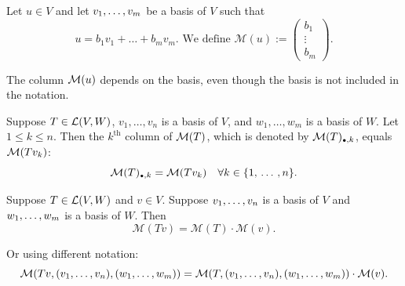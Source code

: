   \begin{mydef} 
    Let $u \in V$ and let $v_1, \dots, v_m$ be a basis of $V$ such that
  \begin{equation}
    u=b_1v_1+\dots+b_mv_m. \text{ We define }
        \mathcal{M}(u) :=
      \left (
      \begin{matrix}
        b_1 \\ \vdots \\ b_m
      \end{matrix}
      \right ).
  \end{equation}

    The column $\mathcal{M}(u)$ depends on the basis, even though the basis is not included in the notation.

  \end{mydef}

  \setcounter{thm}{74}
  \begin{thm} [$\mmatrix(T)_{\mathsmaller{\bullet}, k} = \mmatrix(T v_k)$]
    Suppose $T \in \mathcal{L}(V,W)$, $v_1, \ldots, v_n$ is a basis of $V$, and $w_1, \ldots, w_m$ is a basis of $W$. Let $1\leq k \leq n$. Then the $k^{\text{th}}$ column of $\mathcal{M}(T)$, which is denoted by $\mmatrix(T)_{\mathsmaller{\bullet}, k}$, equals $\mathcal{M}(Tv_k)$:
    \begin{equation}
      \mmatrix(T)_{\mathsmaller{\bullet}, k}=\mmatrix(Tv_k) \quad \forall k \in \{1, \ddd, n\}.
    \end{equation}
  \end{thm}

  \begin{thm} 
    Suppose $T\in {\mathcal{L}(V,W)}$ and $v\in V$. Suppose $v_1, \dots, v_n$ is a basis of $V$ and $w_1, \dots, w_m$ is a basis of $W$. Then
    \begin{equation}
      \mathcal{M} (Tv)=\mathcal{M}(T) \cdot \mathcal{M}(v).
    \end{equation}

    Or using different notation:
    \begin{equation}
      \mathcal{M} (Tv, (v_1, \dots, v_n), (w_1, \dots, w_m))=\mathcal{M}(T, (v_1, \dots, v_n), (w_1, \dots, w_m)) \cdot \mathcal{M}(v).
    \end{equation}

  \end{thm}

